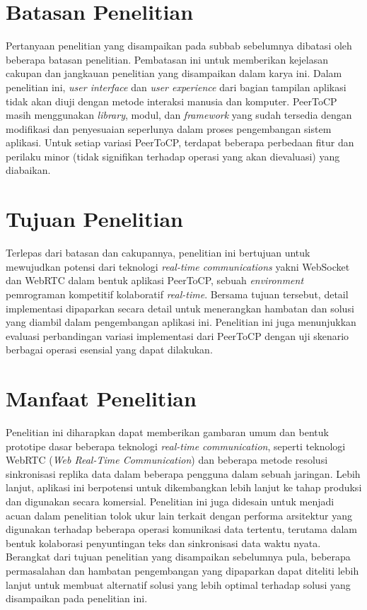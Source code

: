 \section{Batasan Penelitian}
\label{sec:batasanMasalah}
Pertanyaan penelitian yang disampaikan pada subbab sebelumnya dibatasi oleh beberapa batasan penelitian. Pembatasan ini untuk memberikan kejelasan cakupan dan jangkauan penelitian yang disampaikan dalam karya ini. Dalam penelitian ini, \textit{user interface} dan \textit{user experience} dari bagian tampilan aplikasi tidak akan diuji dengan metode interaksi manusia dan komputer. PeerToCP masih menggunakan \textit{library}, modul, dan \textit{framework} yang sudah tersedia dengan modifikasi dan penyesuaian seperlunya dalam proses pengembangan sistem aplikasi. Untuk setiap variasi PeerToCP, terdapat beberapa perbedaan fitur dan perilaku minor (tidak signifikan terhadap operasi yang akan dievaluasi) yang diabaikan.



\section{Tujuan Penelitian}
\label{sec:tujuan}
Terlepas dari batasan dan cakupannya, penelitian ini bertujuan untuk mewujudkan potensi dari teknologi \textit{real-time communications} yakni WebSocket dan WebRTC dalam bentuk aplikasi PeerToCP, sebuah \textit{environment} pemrograman kompetitif kolaboratif \textit{real-time}. Bersama tujuan tersebut, detail implementasi dipaparkan secara detail untuk menerangkan hambatan dan solusi yang diambil dalam pengembangan aplikasi ini. Penelitian ini juga menunjukkan evaluasi perbandingan variasi implementasi dari PeerToCP dengan uji skenario berbagai operasi esensial yang dapat dilakukan.


\section{Manfaat Penelitian}
\label{sec:manfaat}
Penelitian ini diharapkan dapat memberikan gambaran umum dan bentuk prototipe dasar beberapa teknologi \textit{real-time communication}, seperti teknologi WebRTC (\textit{Web Real-Time Communication}) dan beberapa metode resolusi sinkronisasi replika data dalam beberapa pengguna dalam sebuah jaringan. Lebih lanjut, aplikasi ini berpotensi untuk dikembangkan lebih lanjut ke tahap produksi dan digunakan secara komersial. Penelitian ini juga didesain untuk menjadi acuan dalam penelitian tolok ukur lain terkait dengan performa arsitektur yang digunakan terhadap beberapa operasi komunikasi data tertentu, terutama dalam bentuk kolaborasi penyuntingan teks dan sinkronisasi data waktu nyata. Berangkat dari tujuan penelitian yang disampaikan sebelumnya pula, beberapa permasalahan dan hambatan pengembangan yang dipaparkan dapat diteliti lebih lanjut untuk membuat alternatif solusi yang lebih optimal terhadap solusi yang disampaikan pada penelitian ini.


